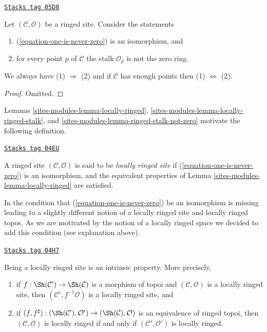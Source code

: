 \begin{lemma}
\label{sites-modules-lemma-ringed-stalk-not-zero}
\href{https://stacks.math.columbia.edu/tag/05D8}{\texttt{Stacks tag 05D8}}

Let $(\mathcal{C}, \mathcal{O})$ be a ringed site. Consider the statements
\begin{enumerate}
\item (\ref{equation-one-is-never-zero}) is an isomorphism, and
\item for every point $p$ of $\mathcal{C}$ the stalk $\mathcal{O}_p$
is not the zero ring.
\end{enumerate}
We always have (1) $\Rightarrow$ (2) and if $\mathcal{C}$ has enough points
then (1) $\Leftrightarrow$ (2).
\end{lemma}

\begin{proof}
Omitted.
\end{proof}

Lemmas \ref{sites-modules-lemma-locally-ringed},
\ref{sites-modules-lemma-locally-ringed-stalk}, and
\ref{sites-modules-lemma-ringed-stalk-not-zero}
motivate the following definition.

\begin{definition}
\label{sites-modules-definition-locally-ringed}
\href{https://stacks.math.columbia.edu/tag/04EU}{\texttt{Stacks tag 04EU}}

A ringed site $(\mathcal{C}, \mathcal{O})$ is said to be
{\it locally ringed site} if (\ref{equation-one-is-never-zero})
is an isomorphism, and the equivalent properties of
Lemma \ref{sites-modules-lemma-locally-ringed}
are satisfied.
\end{definition}

In \cite[Expos\'e IV, Exercice 13.9]{SGA4} the condition that
(\ref{equation-one-is-never-zero}) be an isomorphism is missing leading to
a slightly different notion of a locally ringed site and locally ringed
topos. As we are motivated by the notion of a locally ringed space we decided
to add this condition (see explanation above).

\begin{lemma}
\label{sites-modules-lemma-locally-ringed-intrinsic}
\href{https://stacks.math.columbia.edu/tag/04H7}{\texttt{Stacks tag 04H7}}

Being a locally ringed site is an intrinsic property.
More precisely,
\begin{enumerate}
\item if $f : \Sh(\mathcal{C}') \to \Sh(\mathcal{C})$
is a morphism of topoi and $(\mathcal{C}, \mathcal{O})$ is
a locally ringed site, then $(\mathcal{C}', f^{-1}\mathcal{O})$
is a locally ringed site, and
\item if
$(f, f^\sharp) : (\Sh(\mathcal{C}'), \mathcal{O}')
\to (\Sh(\mathcal{C}), \mathcal{O})$
is an equivalence of ringed topoi, then
$(\mathcal{C}, \mathcal{O})$ is locally ringed if and only if
$(\mathcal{C}', \mathcal{O}')$
is locally ringed.
\end{enumerate}
\end{lemma}

